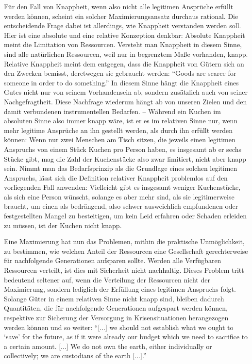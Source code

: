 \documentclass[a4paper]{thesis}
\begin{document}
Für den Fall von Knappheit, wenn also nicht alle legitimen Ansprüche erfüllt werden können, scheint ein solcher Maximierungsansatz durchaus rational. Die entscheidende Frage dabei ist allerdings, wie Knappheit verstanden werden soll. Hier ist eine absolute und eine relative Konzeption denkbar: Absolute Knappheit meint die Limitation von Ressourcen. Versteht man Knappheit in diesem Sinne, sind alle natürlichen Ressourcen, weil nur in begrenztem Maße vorhanden, knapp. Relative Knappheit meint dem entgegen, dass die Knappheit von Gütern sich an den Zwecken bemisst, deretwegen sie gebraucht werden: \enquote{Goods are scarce for someone in order to do something.} In diesem Sinne hängt die Knappheit eines Gutes nicht nur von seinem Vorhandensein ab, sondern zusätzlich auch von seiner Nachgefragtheit. Diese Nachfrage wiederum hängt ab von unseren Zielen und den damit verbundenen instrumentellen Bedarfen. -- Während ein Kuchen im absoluten Sinne also immer knapp wäre, ist er es im relativen Sinne nur, wenn mehr legitime Ansprüche an ihn gestellt werden, als durch ihn erfüllt werden können: Wenn nur zwei Menschen am Tisch sitzen, die jeweils einen legitimen Anspruchs von einem Stück Kuchen pro Person haben, es insgesamt ab er sechs Stücke gibt, mag die Zahl der Kuchenstücke also zwar limitiert, nicht aber knapp sein. Nimmt man das Bedarfsprinzip als die Grundlage eines solchen legitimen Anspruchs, lässt sich die Definition relativer Knappheit problemlos auf den vorliegenden Fall anwenden: Vielleicht gibt es insgesamt weniger Kuchenstücke, als sich eine Person wünscht, solange es aber mehr sind, als sie legitimerweise braucht, um einen als bedrängend, also schwer ausweichlich empfundenen oder festgestellten Mangel zu besteitigen, um kein Leid erfahren oder Schaden erleiden zu müssen, ist der Kuchen nicht knapp.

Eine Maximierung hat nun das Problemen, mithin die praktische Unmöglichkeit, zu bestimmen, wie welchen Anteil der Ressourcen eine Gesellschaft gerechterweise für nachfolgende Generationen aufsparen sollte. Werden alle Verfügbaren Ressourcen verteilt, ist dies mit Sicherheit nicht nachhaltig. Dieses Problem tritt bedeutend seltener auf, wenn die Verteilung der Ressourcen nicht der Maximierung, sondern lediglich der Erfüllung eines legitimen Anspruchs folgt. Solange Güter in einem relativen Sinne nicht knapp sind, bleiben dadurch Quantitäten, die für nachfolgende Generationen aufgespart werden können, respektive zur Sicherung der Versorgung in Krisensituationen herangezogen werden können und so weiter: \enquote{[...] we should not establish what we ought to \enquote{save} for the future, as if it were already our budget which we need to sacrifice to a certain amount. [...] We do not own the earth, either individually or collectively; we are custodians of the earth [...].}
\end{document}
